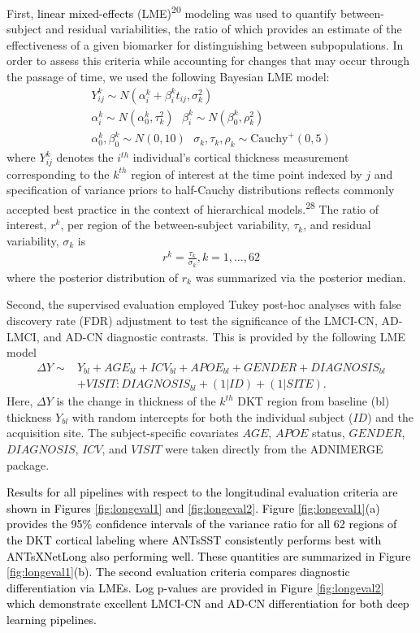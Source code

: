 \documentclass[
  12pt,
]{article}
\begin{document}
First, \textcolor{black}{linear mixed-effects} (LME)\textsuperscript{20}
modeling was used to quantify between-subject and residual
variabilities, the ratio of which provides an estimate of the
effectiveness of a given biomarker for distinguishing between
subpopulations. In order to assess this criteria while accounting for
changes that may occur through the passage of time, we used the
following Bayesian LME model: \begin{gather}
  Y^k_{ij} \sim N(\alpha^k_i + \beta^k_i t_{ij}, \sigma_k^2) \\ \nonumber
  \alpha^k_i \sim N(\alpha^k_0, \tau^2_k) \,\,\,\, \beta^k_i \sim N(\beta^k_0, \rho^2_k) \\ \nonumber
  \alpha^k_0, \beta^k_0 \sim N(0,10) \,\,\,\,  \sigma_k, \tau_k, \rho_k \sim \mbox{Cauchy}^+ (0, 5)
\end{gather} where \(Y^k_{ij}\) denotes the \(i^{th}\) individual's
cortical thickness measurement corresponding to the \(k^{th}\) region of
interest at the time point indexed by \(j\) and specification of
variance priors to half-Cauchy distributions reflects commonly accepted
best practice in the context of hierarchical models.\textsuperscript{28}
The ratio of interest, \(r^k\), per region of the between-subject
variability, \(\tau_k\), and residual variability, \(\sigma_k\) is
\begin{align}
  r^k = \frac{\tau_k}{\sigma_k}, k = 1,\ldots,62
\end{align} where the posterior distribution of \(r_k\) was summarized
via the posterior median.

Second, the supervised evaluation employed Tukey post-hoc analyses with
false discovery rate (FDR) adjustment to test the significance of the
LMCI-CN, AD-LMCI, and AD-CN diagnostic contrasts. This is provided by
the following LME model \begin{align}
  \Delta Y \sim & Y_{bl} + AGE_{bl} + ICV_{bl} + APOE_{bl} + GENDER + DIAGNOSIS_{bl} \\ \nonumber
                & + VISIT:DIAGNOSIS_{bl} + (1 | ID) + (1 | SITE).
\end{align} Here, \(\Delta Y\) is the change in thickness of the
\(k^{th}\) DKT region from baseline (bl) thickness \(Y_{bl}\) with
random intercepts for both the individual subject (\(ID\)) and the
acquisition site. The subject-specific covariates \(AGE\), \(APOE\)
status, \(GENDER\), \(DIAGNOSIS\), \(ICV\), and \(VISIT\) were taken
directly from the ADNIMERGE package.

\textcolor{black}{Results for all pipelines with respect to the longitudinal
evaluation criteria are shown in Figures \ref{fig:longeval1} and
\ref{fig:longeval2}.  Figure \ref{fig:longeval1}(a) provides the 95\% confidence
intervals of the variance ratio for all 62 regions of the DKT cortical labeling
where ANTsSST consistently performs best with ANTsXNetLong also performing
well.  These quantities are summarized in Figure \ref{fig:longeval1}(b).  The
second evaluation criteria compares diagnostic differentiation via LMEs.  Log
p-values are provided in Figure \ref{fig:longeval2} which demonstrate excellent
LMCI-CN and AD-CN differentiation for both deep learning pipelines.}
\end{document}
